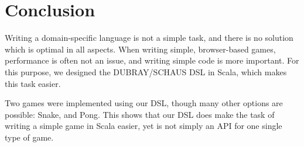 \documentclass[journal,onecolumn, 9pt]{IEEEtran}
\theoremstyle{definition}
\begin{document}
\section{Conclusion}
Writing a domain-specific language is not a simple task, and there is no solution which is optimal in all aspects.
When writing simple, browser-based games, performance is often not an issue, and writing simple code is more important.
For this purpose, we designed the DUBRAY/SCHAUS DSL in Scala, which makes this task easier.

Two games were implemented using our DSL, though many other options are possible: Snake, and Pong.
This shows that our DSL does make the task of writing a simple game in Scala easier, yet is not simply an API for one single type of game.
\end{document}
